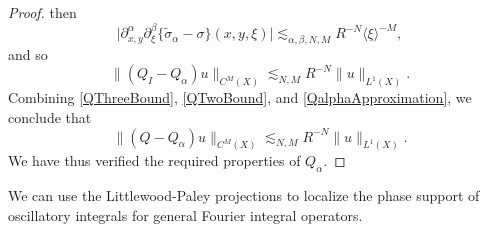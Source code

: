 \begin{proof}
    then
    \begin{equation} \Big|\partial_{x,y}^\alpha \partial_\xi^\beta \big\{ \tilde{\sigma}_\alpha - \sigma \big\}(x,y,\xi) \Big| \lesssim_{\alpha,\beta,N,M} R^{-N} \langle \xi \rangle^{-M}, \end{equation}
    and so
    \begin{equation} \label{QalphaApproximation}
        \| ( Q_I - Q_\alpha ) u \|_{C^M(X)} \lesssim_{N,M} R^{-N} \| u \|_{L^1(X)}.
    \end{equation}
    Combining \eqref{QThreeBound}, \eqref{QTwoBound}, and \eqref{QalphaApproximation}, we conclude that
    \begin{equation} \label{QApproximationTheorem}
        \| (Q - Q_\alpha) u \|_{C^M(X)} \lesssim_{N,M} R^{-N} \| u \|_{L^1(X)}.
    \end{equation}
    We have thus verified the required properties of $Q_\alpha$.
\end{proof}

We can use the Littlewood-Paley projections to localize the phase support of oscillatory integrals for general Fourier integral operators.

